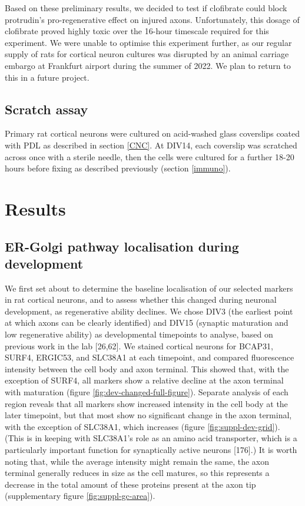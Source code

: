 \documentclass[
  12pt,
  a4paper,
]{book}
\begin{document}
Based on these preliminary results, we decided to test if clofibrate could block protrudin's pro-regenerative effect on injured axons. Unfortunately, this dosage of clofibrate proved highly toxic over the 16-hour timescale required for this experiment. We were unable to optimise this experiment further, as our regular supply of rats for cortical neuron cultures was disrupted by an animal carriage embargo at Frankfurt airport during the summer of 2022. We plan to return to this in a future project.

\hypertarget{scratch-assay}{%
\subsection{Scratch assay}\label{scratch-assay}}

Primary rat cortical neurons were cultured on acid-washed glass coverslips coated with PDL as described in section \ref{CNC}. At DIV14, each coverslip was scratched across once with a sterile needle, then the cells were cultured for a further 18-20 hours before fixing as described previously (section \ref{immuno}).

\hypertarget{results-2}{%
\section{Results}\label{results-2}}

\hypertarget{ER-dev}{%
\subsection{ER-Golgi pathway localisation during development}\label{ER-dev}}

We first set about to determine the baseline localisation of our selected markers in rat cortical neurons, and to assess whether this changed during neuronal development, as regenerative ability declines. We chose DIV3 (the earliest point at which axons can be clearly identified) and DIV15 (synaptic maturation and low regenerative ability) as developmental timepoints to analyse, based on previous work in the lab {[}26,62{]}. We stained cortical neurons for BCAP31, SURF4, ERGIC53, and SLC38A1 at each timepoint, and compared fluorescence intensity between the cell body and axon terminal. This showed that, with the exception of SURF4, all markers show a relative decline at the axon terminal with maturation (figure \ref{fig:dev-changed-full-figure}). Separate analysis of each region reveals that all markers show increased intensity in the cell body at the later timepoint, but that most show no significant change in the axon terminal, with the exception of SLC38A1, which increases (figure \ref{fig:suppl-dev-grid}). (This is in keeping with SLC38A1's role as an amino acid transporter, which is a particularly important function for synaptically active neurons {[}176{]}.) It is worth noting that, while the average intensity might remain the same, the axon terminal generally reduces in size as the cell matures, so this represents a decrease in the total amount of these proteins present at the axon tip (supplementary figure \ref{fig:suppl-gc-area}).
\end{document}
